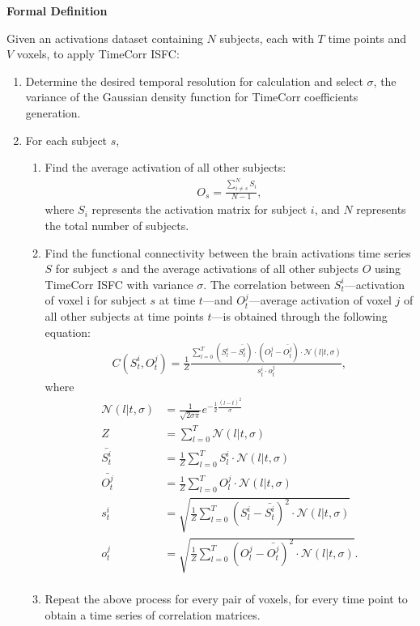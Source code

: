 \documentclass[11pt]{article}
\begin{document}
\large{\textbf{Formal Definition}}

\normalsize
Given an activations dataset containing $N$ subjects, each with $T$ time points and $V$ voxels, to apply TimeCorr ISFC:
\begin{enumerate}
\item Determine the desired temporal resolution for calculation and select $\sigma$, the variance of the Gaussian density function for TimeCorr coefficients generation.
\item For each subject $s$,
\begin{enumerate}
\item Find the average activation of all other subjects:
\begin{align*}
O_s=\frac{\sum_{i\neq s}^N S_i}{N-1},
\end{align*}
where $S_i$ represents the activation matrix for subject $i$, and $N$ represents the total number of subjects.
\item Find the functional connectivity between the brain activations time series $S$ for subject $s$ and the average activations of all other subjects $O$ using TimeCorr ISFC with variance $\sigma$. The correlation between $S^i_t$---activation of voxel i for subject $s$ at time $t$---and $O^j_t$---average activation of voxel $j$ of all other subjects at time points $t$---is obtained through the following equation:
\begin{align*}
C(S^i_t,O^j_t) = \frac{1}{Z}\frac{\sum_{l=0}^T (S_l^i - \bar{S^i_t})\cdot(O^j_l - \bar{O^j_t})\cdot \mathcal{N}(l|t,\sigma)}{s_t^i \cdot o_t^j},
\end{align*}
where
\begin{align*}
\mathcal{N}(l|t,\sigma) &= \frac{1}{\sqrt{2\sigma\pi}}e^{-\frac12 \frac{(l-t)^2}{\sigma}}\\
Z &= \sum_{l=0}^T \mathcal{N}(l|t,\sigma)\\
\bar{S^i_t} &=\frac{1}{Z} \sum_{l=0}^T S^i_l \cdot \mathcal{N}(l|t,\sigma)\\
\bar{O^j_t} &=\frac{1}{Z} \sum_{l=0}^T O^j_l \cdot \mathcal{N}(l|t,\sigma)\\
s_t^i &=\sqrt{ \frac{1}{Z}\sum_{l=0}^T (S_l^i-\bar{S_t^i})^2 \cdot \mathcal{N}(l|t,\sigma)}\\
o_t^j &=\sqrt{ \frac{1}{Z}\sum_{l=0}^T (O_l^j-\bar{O_t^j})^2 \cdot \mathcal{N}(l|t,\sigma)}.\\
\end{align*}
\item Repeat the above process for every pair of voxels, for every time point to obtain a time series of correlation matrices.

\end{enumerate}
\end{enumerate}
\end{document}
